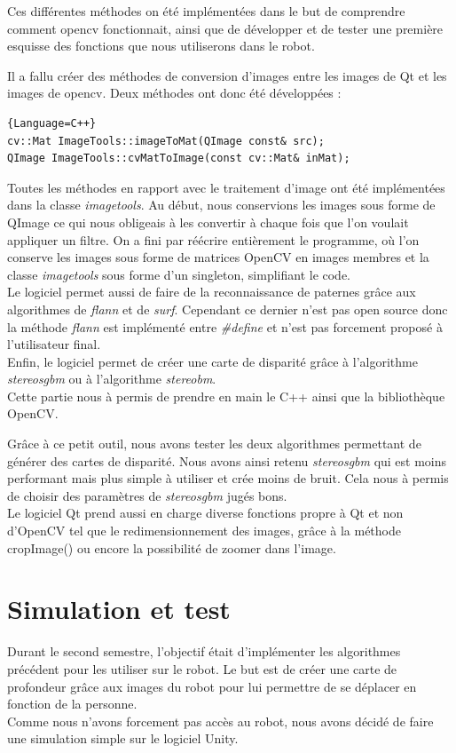\documentclass[12pt,a4paper]{report}
\begin{document}
Ces différentes méthodes on été implémentées dans le but de comprendre comment opencv fonctionnait, ainsi que de développer et de tester une première esquisse des fonctions que nous utiliserons dans le robot.

Il a fallu créer des méthodes de conversion d'images entre les images de Qt et les images de opencv. Deux méthodes ont donc été développées : 

\begin{lstlisting}{Language=C++}
cv::Mat ImageTools::imageToMat(QImage const& src);
QImage ImageTools::cvMatToImage(const cv::Mat& inMat);
\end{lstlisting}

Toutes les méthodes en rapport avec le traitement d'image ont été implémentées dans la classe \textit{imagetools}. Au début, nous conservions les images sous forme de QImage ce qui nous obligeais à les convertir à chaque fois que l'on voulait appliquer un filtre. On a fini par réécrire entièrement le programme, où l'on conserve les images sous forme de matrices OpenCV en images membres et la classe \textit{imagetools} sous forme d'un singleton, simplifiant le code.\\
Le logiciel permet aussi de faire de la reconnaissance de paternes grâce aux algorithmes de \textit{flann} et de \textit{surf}. Cependant ce dernier n'est pas open source donc la méthode \textit{flann} est implémenté entre \textit{\#define} et n'est pas forcement proposé à l'utilisateur final.\\
Enfin, le logiciel permet de créer une carte de disparité grâce à l'algorithme \textit{stereosgbm} ou à l'algorithme \textit{stereobm}.\\

Cette partie nous à permis de prendre en main le C++ ainsi que la bibliothèque OpenCV. 

Grâce à ce petit outil, nous avons tester les deux algorithmes permettant de générer des cartes de disparité. Nous avons ainsi retenu \textit{stereosgbm} qui est moins performant mais plus simple à utiliser et crée moins de bruit. Cela nous à permis de choisir des paramètres de \textit{stereosgbm} jugés bons.\\

Le logiciel Qt prend aussi en charge diverse fonctions propre à Qt et non d'OpenCV tel que le redimensionnement des images, grâce à la méthode cropImage() ou encore la possibilité de zoomer dans l'image.

\section{Simulation et test}
Durant le second semestre, l'objectif était d'implémenter les algorithmes précédent pour les utiliser sur le robot. Le but est de créer une carte de profondeur grâce aux images du robot pour lui permettre de se déplacer en fonction de la personne.\\
Comme nous n'avons forcement pas accès au robot, nous avons décidé de faire une simulation simple sur le logiciel Unity.\\
\end{document}
